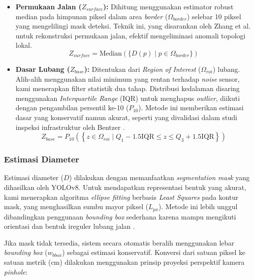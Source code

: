\begin{itemize}
    \item \textbf{Permukaan Jalan ($Z_{surface}$):} Dihitung menggunakan estimator robust median pada himpunan piksel dalam area \textit{border} ($\Omega_{border}$) selebar 10 piksel yang mengelilingi mask deteksi. Teknik ini, yang disarankan oleh Zhang et al. \cite{zhang2020} untuk rekonstruksi permukaan jalan, efektif mengeliminasi anomali topologi lokal.
    \begin{equation}
    Z_{surface} = \text{Median}(\{D(p) \mid p \in \Omega_{border}\})
    \end{equation}
    
    \item \textbf{Dasar Lubang ($Z_{base}$):} Ditentukan dari \textit{Region of Interest} ($\Omega_{roi}$) lubang. Alih-alih menggunakan nilai minimum yang rentan terhadap \textit{noise} sensor, kami menerapkan filter statistik dua tahap. Distribusi kedalaman disaring menggunakan \textit{Interquartile Range} (IQR) untuk menghapus \textit{outlier}, diikuti dengan pengambilan persentil ke-10 ($P_{10}$). Metode ini memberikan estimasi dasar yang konservatif namun akurat, seperti yang divalidasi dalam studi inspeksi infrastruktur oleh Bentzer \cite{bentzer2025}.
    \begin{equation}
    Z_{base} = P_{10}\left(\left\{z \in \Omega_{roi} \mid Q_1 - 1.5\text{IQR} \leq z \leq Q_3 + 1.5\text{IQR}\right\}\right)
    \end{equation}
\end{itemize}

\subsubsection{Estimasi Diameter}
Estimasi diameter ($D$) dilakukan dengan memanfaatkan \textit{segmentation mask} yang dihasilkan oleh YOLOv8. Untuk mendapatkan representasi bentuk yang akurat, kami menerapkan algoritma \textit{ellipse fitting} berbasis \textit{Least Squares} pada kontur mask, yang menghasilkan sumbu mayor piksel ($L_{px}$). Metode ini lebih unggul dibandingkan penggunaan \textit{bounding box} sederhana karena mampu mengikuti orientasi dan bentuk ireguler lubang jalan \cite{singh2021}.

Jika mask tidak tersedia, sistem secara otomatis beralih menggunakan lebar \textit{bounding box} ($w_{bbox}$) sebagai estimasi konservatif. Konversi dari satuan piksel ke satuan metrik (cm) dilakukan menggunakan prinsip proyeksi perspektif kamera \textit{pinhole}:

